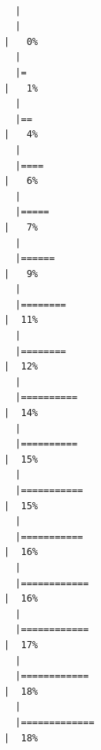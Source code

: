 \documentclass[
  letterpaper,
  DIV=11,
  numbers=noendperiod]{scrreprt}
\begin{document}
\begin{verbatim}

  |                                                                            
  |                                                                      |   0%
  |                                                                            
  |=                                                                     |   1%
  |                                                                            
  |==                                                                    |   4%
  |                                                                            
  |====                                                                  |   6%
  |                                                                            
  |=====                                                                 |   7%
  |                                                                            
  |======                                                                |   9%
  |                                                                            
  |========                                                              |  11%
  |                                                                            
  |========                                                              |  12%
  |                                                                            
  |==========                                                            |  14%
  |                                                                            
  |==========                                                            |  15%
  |                                                                            
  |===========                                                           |  15%
  |                                                                            
  |===========                                                           |  16%
  |                                                                            
  |============                                                          |  16%
  |                                                                            
  |============                                                          |  17%
  |                                                                            
  |============                                                          |  18%
  |                                                                            
  |=============                                                         |  18%

\end{verbatim}
\end{document}
